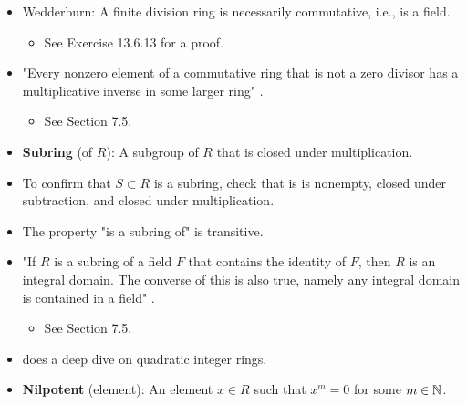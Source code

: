 \documentclass[../notes.tex]{subfiles}
\begin{document}
\begin{itemize}
\begin{proposition}
    \end{proposition}
    \begin{corollary}\label{cly:7.3}
        Any finite integral domain is a field.
        \begin{proof}
            Let $R$ be a finite integral domain, and $a$ be an arbitrary, nonzero element of $R$. We seek to find $b$ such that $ab=1$, which will imply that $a$ (i.e., every element) is a unit in $R$.\par
            Define the map $x\mapsto ax$. By the cancellation law, this map is injective. Injectivity plus the fact that $R$ is finite proves that this map is surjective. Thus, there exists $b\in R$ such that $ab=1$, as desired.
        \end{proof}
    \end{corollary}
    \item Wedderburn: A finite division ring is necessarily commutative, i.e., is a field.
    \begin{itemize}
        \item See Exercise 13.6.13 for a proof.
    \end{itemize}
    \item "Every nonzero element of a commutative ring that is not a zero divisor has a multiplicative inverse in some larger ring" \parencite[228]{bib:DummitFoote}.
    \begin{itemize}
        \item See Section 7.5.
    \end{itemize}
    \item \textbf{Subring} (of $R$): A subgroup of $R$ that is closed under multiplication.
    \item To confirm that $S\subset R$ is a subring, check that is is nonempty, closed under subtraction, and closed under multiplication.
    \item The property "is a subring of" is transitive.
    \item "If $R$ is a subring of a field $F$ that contains the identity of $F$, then $R$ is an integral domain. The converse of this is also true, namely any integral domain is contained in a field" \parencite[229]{bib:DummitFoote}.
    \begin{itemize}
        \item See Section 7.5.
    \end{itemize}
    \item \textcite{bib:DummitFoote} does a deep dive on quadratic integer rings.
    \item \textbf{Nilpotent} (element): An element $x\in R$ such that $x^m=0$ for some $m\in\mathbb{N}$.
\end{itemize}
\end{document}
